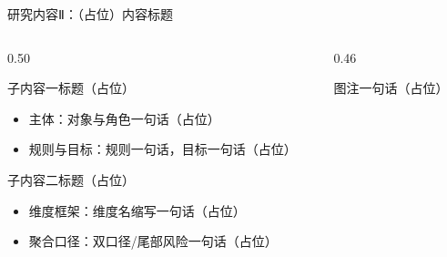 \documentclass[aspectratio=169,11pt]{beamer}
\begin{document}
\begin{frame}{研究内容Ⅱ：（占位）内容标题}
  \footnotesize
  \begin{columns}[T]
    \begin{column}{0.50\textwidth}
      \begin{point}{子内容一标题（占位）}
        \begin{itemize}
          \item \textcolor{primary}{主体}：对象与角色一句话（占位）
          \item \textcolor{primary}{规则与目标}：规则一句话，目标一句话（占位）
        \end{itemize}
      \end{point}
      \begin{point}{子内容二标题（占位）}
        \begin{itemize}
          \item \textcolor{primary}{维度框架}：维度名缩写一句话（占位）
          \item \textcolor{primary}{聚合口径}：双口径/尾部风险一句话（占位）
        \end{itemize}
      \end{point}
    \end{column}
    \begin{column}{0.46\textwidth}
      \begin{center}

        \vskip0.8mm
        {\scriptsize\color{muted} 图注一句话（占位）}
      \end{center}
    \end{column}
  \end{columns}
\end{frame}
\end{document}
